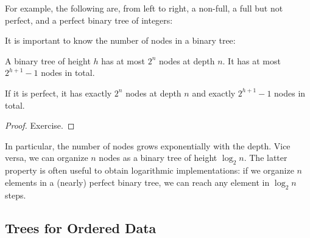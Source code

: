 For example, the following are, from left to right, a non-full, a full but not perfect, and a perfect binary tree of integers:
\begin{center}
\tb\tb
{}
\tb\tb
{}
\end{center}


It is important to know the number of nodes in a binary tree:

\begin{theorem}\label{thm:ad:bintree}
A binary tree of height $h$ has at most $2^n$ nodes at depth $n$.
It has at most $2^{h+1}-1$ nodes in total.

If it is perfect, it has exactly $2^n$ nodes at depth $n$ and exactly $2^{h+1}-1$ nodes in total.
\end{theorem}
\begin{proof}
Exercise.
\end{proof}

In particular, the number of nodes grows exponentially with the depth.
Vice versa, we can organize $n$ nodes as a binary tree of height $\log_2 n$.
The latter property is often useful to obtain logarithmic implementations: if we organize $n$ elements in a (nearly) perfect binary tree, we can reach any element in $\log_2 n$ steps.


\subsection{Trees for Ordered Data}

